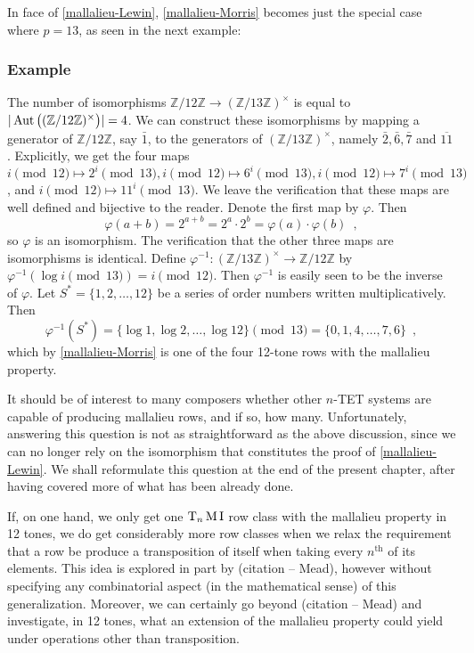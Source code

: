 In face of \ref{mallalieu-Lewin}, \ref{mallalieu-Morris} becomes just the special case where $p = 13$, as seen in the next example:

\subsubsection{Example}

The number of isomorphisms $\mathbb{Z} / 12 \mathbb{Z} \to (\mathbb{Z} / 13 \mathbb{Z})^\times$ is equal to $|\operatorname{Aut}\big((\mathbb{Z} / 12 \mathbb{Z})^\times\big)| = 4$. We can construct these isomorphisms by mapping a generator of $\mathbb{Z} / 12 \mathbb{Z}$, say $\bar{1}$, to the generators of $(\mathbb{Z} / 13 \mathbb{Z})^\times$, namely $\bar{2}, \bar{6}, \bar{7}$ and $\overline{11}$. Explicitly, we get the four maps $i \pmod{12} \mapsto 2^i \pmod{13}, i \pmod{12} \mapsto 6^i \pmod{13}, i \pmod{12} \mapsto 7^i \pmod{13}$, and $i \pmod{12} \mapsto 11^i \pmod{13}$. We leave the verification that these maps are well defined and bijective to the reader. Denote the first map by $\varphi$. Then
$$
\varphi(a + b) = 2^{a + b} = 2^a \cdot 2^b = \varphi(a) \cdot \varphi(b) \enspace,
$$
so $\varphi$ is an isomorphism. The verification that the other three maps are isomorphisms is identical. Define $\varphi^{-1} : (\mathbb{Z} / 13 \mathbb{Z})^\times \to \mathbb{Z} / 12 \mathbb{Z}$ by $\varphi^{-1}(\log i \pmod{13}) = i \pmod{12}$. Then $\varphi^{-1}$ is easily seen to be the inverse of $\varphi$. Let $S^* = \{ 1, 2, \dots, 12 \}$ be a series of order numbers written multiplicatively. Then
$$
\varphi^{-1}(S^*) = \{ \log 1, \log 2, \dots, \log 12 \} \pmod{13} = \{ 0, 1, 4, \dots, 7, 6 \} \enspace,
$$
which by \ref{mallalieu-Morris} is one of the four 12-tone rows with the mallalieu property.

It should be of interest to many composers whether other $n$-TET systems are capable of producing mallalieu rows, and if so, how many. Unfortunately, answering this question is not as straightforward as the above discussion, since we can no longer rely on the isomorphism that constitutes the proof of \ref{mallalieu-Lewin}. We shall reformulate this question at the end of the present chapter, after having covered more of what has been already done.

If, on one hand, we only get one $\operatorname{T}_n\operatorname{M}\operatorname{I}$ row class with the mallalieu property in 12 tones, we do get considerably more row classes when we relax the requirement that a row be produce a transposition of itself when taking every $n^\text{th}$ of its elements. This idea is explored in part by (citation -- Mead), however without specifying any combinatorial aspect (in the mathematical sense) of this generalization. Moreover, we can certainly go beyond (citation -- Mead) and investigate, in 12 tones, what an extension of the mallalieu property could yield under operations other than transposition.

